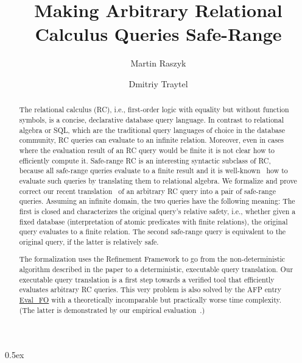 \documentclass[10pt,a4paper]{article}
\begin{document}
\title{Making Arbitrary Relational Calculus Queries Safe-Range}
\author{Martin Raszyk \and Dmitriy Traytel}

\maketitle

\begin{abstract}

The relational calculus (RC), i.e., first-order logic with equality but without
function symbols, is a concise, declarative database query language. In
contrast to relational algebra or SQL, which are the traditional query
languages of choice in the database community, RC queries can evaluate to an
infinite relation. Moreover, even in cases where the evaluation result of an RC
query would be finite it is not clear how to efficiently compute it. Safe-range
RC is an interesting syntactic subclass of RC, because all safe-range queries
evaluate to a finite result and it is
well-known~\cite[\S5.4]{DBLP:books/aw/AbiteboulHV95} how to evaluate such
queries by translating them to relational algebra. We formalize and prove
correct our recent translation~\cite{DBLP:conf/icdt/RaszykBKT22} of an
arbitrary RC query into a pair of safe-range queries. Assuming an infinite
domain, the two queries have the following meaning: The first is closed and
characterizes the original query's relative safety, i.e., whether given a fixed
database (interpretation of atomic predicates with finite relations), the
original query evaluates to a finite relation. The second safe-range query is
equivalent to the original query, if the latter is relatively safe.

The formalization uses the Refinement Framework to go from the
non-deterministic algorithm described in the paper to a deterministic,
executable query translation. Our executable query translation is a first step
towards a verified tool that efficiently evaluates arbitrary RC queries. This
very problem is also solved by the AFP entry
\href{https://isa-afp.org/entries/Eval_FO.html}{Eval\_FO} with a theoretically
incomparable but practically worse time complexity. (The latter is demonstrated
by our empirical evaluation~\cite{DBLP:conf/icdt/RaszykBKT22}.)

\end{abstract}

\tableofcontents

\parindent 0pt\parskip 0.5ex





\end{document}
